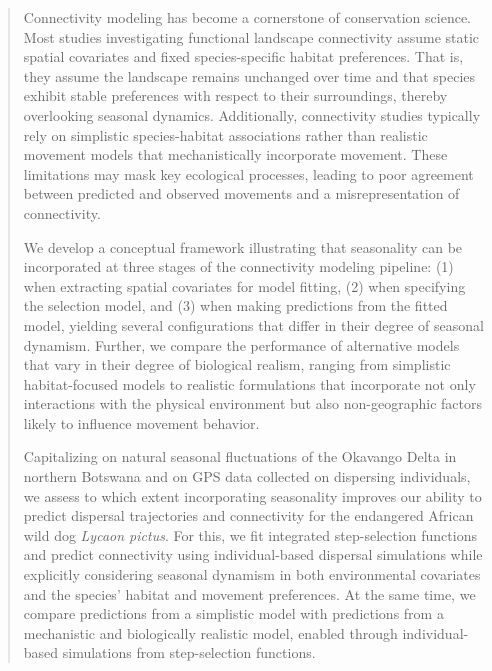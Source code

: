 \documentclass[abstract=on,10pt,a4paper,bibliography=totocnumbered]{article}
\begin{document}
\newpage
\begin{abstract}

Connectivity modeling has become a cornerstone of conservation science. Most
studies investigating functional landscape connectivity assume static spatial
covariates and fixed species-specific habitat preferences. That is, they assume
the landscape remains unchanged over time and that species exhibit stable
preferences with respect to their surroundings, thereby overlooking seasonal
dynamics. Additionally, connectivity studies typically rely on simplistic
species-habitat associations rather than realistic movement models that
mechanistically incorporate movement. These limitations may mask key ecological
processes, leading to poor agreement between predicted and observed movements
and a misrepresentation of connectivity.

We develop a conceptual framework illustrating that seasonality can be
incorporated at three stages of the connectivity modeling pipeline: (1) when
extracting spatial covariates for model fitting, (2) when specifying the
selection model, and (3) when making predictions from the fitted model, yielding
several configurations that differ in their degree of seasonal dynamism.
Further, we compare the performance of alternative models that vary in their
degree of biological realism, ranging from simplistic habitat-focused models to
realistic formulations that incorporate not only interactions with the physical
environment but also non-geographic factors likely to influence movement
behavior.

Capitalizing on natural seasonal fluctuations of the Okavango Delta in northern
Botswana and on GPS data collected on dispersing individuals, we assess to which
extent incorporating seasonality improves our ability to predict dispersal
trajectories and connectivity for the endangered African wild dog \textit{Lycaon
pictus}. For this, we fit integrated step-selection functions and predict
connectivity using individual-based dispersal simulations while explicitly
considering seasonal dynamism in both environmental covariates and the species’
habitat and movement preferences. At the same time, we compare predictions from
a simplistic model with predictions from a mechanistic and biologically
realistic model, enabled through individual-based simulations from
step-selection functions.


\end{abstract}
\end{document}
